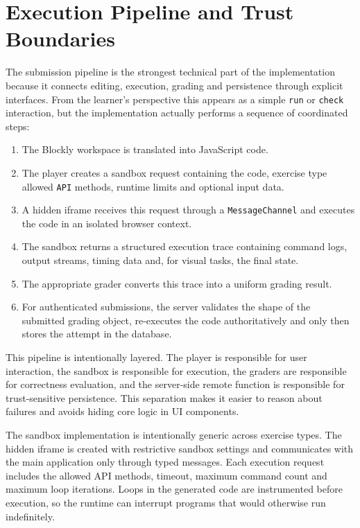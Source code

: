 \section{Execution Pipeline and Trust Boundaries}
\label{sec:execution-pipeline}
The submission pipeline is the strongest technical part of the implementation because it connects
editing, execution, grading and persistence through explicit interfaces.
From the learner's perspective this appears as a simple \texttt{run} or \texttt{check} interaction,
but the implementation actually performs a sequence of coordinated steps:
\begin{enumerate}
  \item The Blockly workspace is translated into JavaScript code.
  \item The player creates a sandbox request containing the code, exercise type allowed
        \texttt{API} methods, runtime limits and optional input data.
  \item A hidden iframe receives this request through a \texttt{MessageChannel}
        and executes the code in an isolated browser context.
  \item The sandbox returns a structured execution trace containing command logs,
        output streams, timing data and, for visual tasks, the final state.
  \item The appropriate grader converts this trace into a uniform grading result.
  \item For authenticated submissions, the server validates the shape of the
        submitted grading object, re-executes the code authoritatively and only
        then stores the attempt in the database.
\end{enumerate}


This pipeline is intentionally layered. The player is responsible for user interaction,
the sandbox is responsible for execution, the graders are responsible for
correctness evaluation, and the server-side remote function is responsible for
trust-sensitive persistence.
This separation makes it easier to reason about failures and avoids hiding core logic in UI components.

The sandbox implementation is intentionally generic across exercise types.
The hidden iframe is created with restrictive sandbox settings and communicates
with the main application only through typed messages.
Each execution request includes the allowed API methods, timeout,
maximum command count and maximum loop iterations.
Loops in the generated code are instrumented before execution,
so the runtime can interrupt programs that would otherwise run indefinitely.

